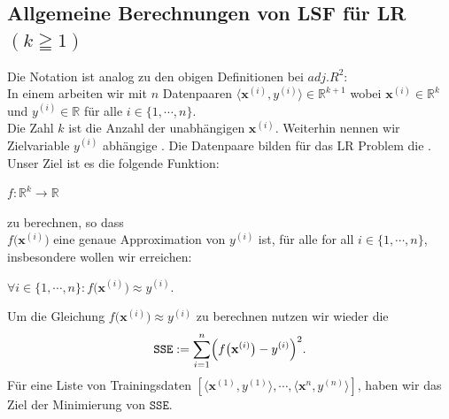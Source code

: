 \documentclass[12pt]{article}
\begin{document}
\subsection{Allgemeine Berechnungen von LSF für LR $(k \geqq 1)$}
%
Die Notation ist analog zu den obigen Definitionen bei $adj.R^2$:\\
In einem {\color{blue}{Linearen Regression (LR) Problem}} arbeiten wir mit $n$ Datenpaaren $\langle\mathbf{x}^{(i)}, y^{(i)} \rangle \in \mathbb{R}^{k+1} $ 
wobei $\mathbf{x}^{(i)} \in \mathbb{R}^k$ und $y^{(i)} \in \mathbb{R}$ für alle $i \in \{1,\cdots,n\}$.  \\
Die Zahl $k$ ist die Anzahl der unabhängigen {\color{blue}{Features ("Prädiktoren")}} $ \mathbf{x}^{(i)} $. Weiterhin nennen wir Zielvariable $ y^{(i)}$ abhängige {\color{blue}{Zielvariable ("target column")}}. Die Datenpaare bilden für das LR Problem die {\color{blue}{Trainings-Menge}}. Unser Ziel ist es die folgende Funktion:  
\\[0.2cm]
\hspace*{1.3cm}
\begin{large}
$ f:\mathbb{R}^k \rightarrow \mathbb{R}$ 
\end{large} 
zu berechnen, so dass 
\\[0.2cm]  
$ f \bigl(\mathbf{x}^{(i)}\bigr)$ eine  genaue Approximation von $y^{(i)}$ ist, für alle for all $i\in\{1,\cdots,n\}$, insbesondere wollen wir erreichen: \\[0.3cm]
\hspace*{1.3cm}
\begin{large}
$\forall i\in\{1,\cdots,n\}:f \bigl(\mathbf{x}^{(i)}\bigr) \approx y^{(i)}$. \\[0.4cm]
\end{large}
%
Um die Gleichung $ f\bigl(\mathbf{x}^{(i)}\bigr) \approx y^{(i)}$ zu berechnen nutzen wir wieder die {\color{blue}{Summe der  quadratischen Fehler "Sum of Squared Errors"}} 
\begin{equation}
  \label{eq:squared-error-1}
  \mathtt{SSE} := \sum\limits_{i=1}^{n} \Bigl(f\bigl(\mathbf{x}^{(i)}\bigr) - y^{(i)}\Bigr)^2. 
\end{equation}
Für eine Liste von Trainingsdaten $[\langle \mathbf{x}^{(1)}, y^{(1)} \rangle, \cdots, \langle \mathbf{x}^{n}, y^{(n)} \rangle] $, haben wir das Ziel der Minimierung von $\mathtt{SSE}$.
%
\end{document}
